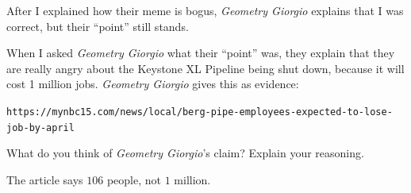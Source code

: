 \documentclass[handout,nooutcomes,noauthor]{ximera}
\begin{document}
\begin{question}
  After I explained how their meme is bogus, \textit{Geometry Giorgio}
  explains that I was correct, but their ``point'' still stands.

  When I asked \textit{Geometry Giorgio} what their ``point'' was,
  they explain that they are really angry about the Keystone XL
  Pipeline being shut down, because it will cost 1 million
  jobs. \textit{Geometry Giorgio} gives this as evidence:
  \begin{center}
    \texttt{https://mynbc15.com/news/local/berg-pipe-employees-expected-to-lose-job-by-april}
  \end{center}
  What do you think of \textit{Geometry Giorgio}'s claim?  Explain
  your reasoning.
  \begin{freeResponse}
    The article says $106$ people, not $1$ million.
  \end{freeResponse}
\end{question}
\mynewpage
\end{document}
